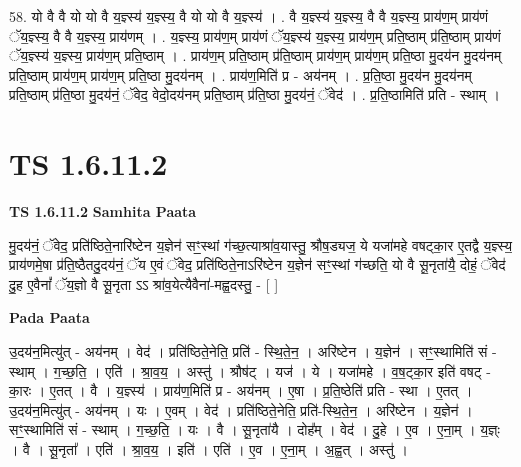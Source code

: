 \documentclass[17pt]{extarticle}
\begin{document}
58. यो वै वै यो यो वै य॒ज्ञ्स्य॑ य॒ज्ञ्स्य॒ वै यो यो वै य॒ज्ञ्स्य॑ । . वै य॒ज्ञ्स्य॑ य॒ज्ञ्स्य॒ वै वै य॒ज्ञ्स्य॒ प्राय॑ण॒म् प्राय॑णं ॅय॒ज्ञ्स्य॒ वै वै य॒ज्ञ्स्य॒ प्राय॑णम् । . य॒ज्ञ्स्य॒ प्राय॑ण॒म् प्राय॑णं ॅय॒ज्ञ्स्य॑ य॒ज्ञ्स्य॒ प्राय॑ण॒म् प्रति॒ष्ठाम् प्र॑ति॒ष्ठाम् 
प्राय॑णं ॅय॒ज्ञ्स्य॑ य॒ज्ञ्स्य॒ प्राय॑ण॒म् प्रति॒ष्ठाम् । . प्राय॑ण॒म् प्रति॒ष्ठाम् प्र॑ति॒ष्ठाम् प्राय॑ण॒म् प्राय॑ण॒म् प्रति॒ष्ठा मु॒दय॑न मु॒दय॑नम् प्रति॒ष्ठाम् प्राय॑ण॒म् प्राय॑ण॒म् प्रति॒ष्ठा मु॒दय॑नम् । . प्राय॑ण॒मिति॑ प्र - अय॑नम् । . प्र॒ति॒ष्ठा मु॒दय॑न मु॒दय॑नम् प्रति॒ष्ठाम् प्र॑ति॒ष्ठा मु॒दय॑नं॒ ॅवेद॒ वेदो॒दय॑नम् प्रति॒ष्ठाम् प्र॑ति॒ष्ठा मु॒दय॑नं॒ ॅवेद॑ । . प्र॒ति॒ष्ठामिति॑ प्रति - स्थाम् । \newline
\pagebreak
{}
\section*{ TS 1.6.11.2 }

\textbf{TS 1.6.11.2 } \newline
\textbf{Samhita Paata} \newline

मु॒दय॑नं॒ ॅवेद॒ प्रति॑ष्ठिते॒नारि॑ष्टेन य॒ज्ञेन॑ सꣳ॒॒स्थां ग॑च्छ॒त्याश्रा॑व॒यास्तु॒ श्रौष॒ड्यज॒ ये यजा॑महे वषट्का॒र ए॒तद्वै य॒ज्ञ्स्य॒ प्राय॑णमे॒षा प्र॑ति॒ष्ठैतदु॒दय॑नं॒ ॅय ए॒वं ॅवेद॒ प्रति॑ष्ठिते॒नाऽरि॑ष्टेन य॒ज्ञेन॑ सꣳ॒॒स्थां ग॑च्छति॒ यो वै सू॒नृता॑यै॒ दोहं॒ ॅवेद॑ दु॒ह ए॒वैनां᳚ ॅय॒ज्ञो वै सू॒नृता ऽऽ श्रा॑व॒येत्यैवैना॑-मह्व॒दस्तु॒ - [ ] \newline

\textbf{Pada Paata} \newline

उ॒दय॑न॒मित्यु॑त् - अय॑नम् । वेद॑ । प्रति॑ष्ठिते॒नेति॒ प्रति॑ - स्थि॒ते॒न॒ । अरि॑ष्टेन । य॒ज्ञेन॑ । सꣳ॒॒स्थामिति॑ सं - स्थाम् । ग॒च्छ॒ति॒ । एति॑ । श्रा॒व॒य॒ । अस्तु॑ । श्रौष॑ट् । यज॑ । ये । यजा॑महे । व॒ष॒ट्का॒र इति॑ वषट् - का॒रः । ए॒तत् । वै । य॒ज्ञ्स्य॑ । प्राय॑ण॒मिति॑ प्र - अय॑नम् । ए॒षा । प्र॒ति॒ष्ठेति॑ प्रति - स्था । ए॒तत् । उ॒दय॑न॒मित्यु॑त् - अय॑नम् । यः । ए॒वम् । वेद॑ । प्रति॑ष्ठिते॒नेति॒ प्रति॑-स्थि॒ते॒न॒ । अरि॑ष्टेन । य॒ज्ञेन॑ । सꣳ॒॒स्थामिति॑ सं - स्थाम् । ग॒च्छ॒ति॒ । यः । वै । सू॒नृता॑यै । दोह᳚म् । वेद॑ । दु॒हे । ए॒व । ए॒ना॒म् । य॒ज्ञ्ः । वै । सू॒नृता᳚ । एति॑ । श्रा॒व॒य॒ । इति॑ । एति॑ । ए॒व । ए॒ना॒म् । अ॒ह्व॒त् । अस्तु॑ ।  \newline
\end{document}
